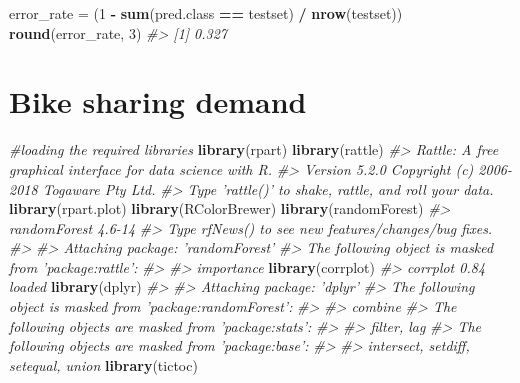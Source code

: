 \documentclass[]{book}
\newenvironment{Shaded}{\begin{snugshade}}{\end{snugshade}}
\newcommand{\CommentTok}[1]{\textcolor[rgb]{0.56,0.35,0.01}{\textit{#1}}}
\newcommand{\DecValTok}[1]{\textcolor[rgb]{0.00,0.00,0.81}{#1}}
\newcommand{\KeywordTok}[1]{\textcolor[rgb]{0.13,0.29,0.53}{\textbf{#1}}}
\newcommand{\NormalTok}[1]{#1}
\newcommand{\OperatorTok}[1]{\textcolor[rgb]{0.81,0.36,0.00}{\textbf{#1}}}
\newcommand{\StringTok}[1]{\textcolor[rgb]{0.31,0.60,0.02}{#1}}
\begin{document}
\begin{Shaded}
\begin{Highlighting}[]
\NormalTok{error_rate =}\StringTok{ }\NormalTok{(}\DecValTok{1} \OperatorTok{-}\StringTok{ }\KeywordTok{sum}\NormalTok{(pred.class }\OperatorTok{==}\StringTok{ }\NormalTok{testset) }\OperatorTok{/}\StringTok{ }\KeywordTok{nrow}\NormalTok{(testset))}
\KeywordTok{round}\NormalTok{(error_rate, }\DecValTok{3}\NormalTok{)}
\CommentTok{#> [1] 0.327}
\end{Highlighting}
\end{Shaded}

\begin{Shaded}
\end{Shaded}

\hypertarget{bike-sharing-demand}{%
\chapter{Bike sharing demand}\label{bike-sharing-demand}}

\begin{Shaded}
\begin{Highlighting}[]
\CommentTok{#loading the required libraries}
\KeywordTok{library}\NormalTok{(rpart)}
\KeywordTok{library}\NormalTok{(rattle)}
\CommentTok{#> Rattle: A free graphical interface for data science with R.}
\CommentTok{#> Version 5.2.0 Copyright (c) 2006-2018 Togaware Pty Ltd.}
\CommentTok{#> Type 'rattle()' to shake, rattle, and roll your data.}
\KeywordTok{library}\NormalTok{(rpart.plot)}
\KeywordTok{library}\NormalTok{(RColorBrewer)}
\KeywordTok{library}\NormalTok{(randomForest)}
\CommentTok{#> randomForest 4.6-14}
\CommentTok{#> Type rfNews() to see new features/changes/bug fixes.}
\CommentTok{#> }
\CommentTok{#> Attaching package: 'randomForest'}
\CommentTok{#> The following object is masked from 'package:rattle':}
\CommentTok{#> }
\CommentTok{#>     importance}
\KeywordTok{library}\NormalTok{(corrplot)}
\CommentTok{#> corrplot 0.84 loaded}
\KeywordTok{library}\NormalTok{(dplyr)}
\CommentTok{#> }
\CommentTok{#> Attaching package: 'dplyr'}
\CommentTok{#> The following object is masked from 'package:randomForest':}
\CommentTok{#> }
\CommentTok{#>     combine}
\CommentTok{#> The following objects are masked from 'package:stats':}
\CommentTok{#> }
\CommentTok{#>     filter, lag}
\CommentTok{#> The following objects are masked from 'package:base':}
\CommentTok{#> }
\CommentTok{#>     intersect, setdiff, setequal, union}
\KeywordTok{library}\NormalTok{(tictoc)}
\end{Highlighting}
\end{Shaded}
\end{document}
